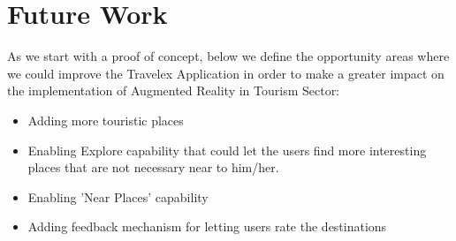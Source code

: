 \section{Future Work}
As we start with a proof of concept, below we define the opportunity areas where we 
could improve the Travelex Application in order to make a greater impact on the 
implementation of Augmented Reality in Tourism Sector:\\

\begin{itemize}
  \item Adding more touristic places 
  \item Enabling Explore capability that could let the users find more interesting 
        places that are not necessary near to him/her.
  \item Enabling 'Near Places' capability
  \item Adding feedback mechanism for letting users rate the destinations
\end{itemize}
